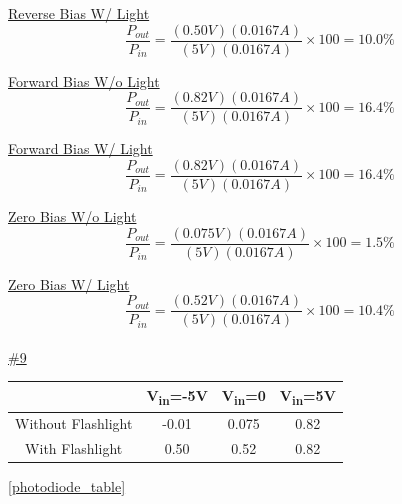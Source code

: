 \underline{Reverse Bias W/ Light}\\
\begin{equation}
\label{eq:Reverse Bias W/ Light}
\frac{P_{out}}{P_{in}} = \frac{(0.50V)(0.0167A)}{(5V)(0.0167A)} \times 100 = 10.0\%
\end{equation}

\underline{Forward Bias W/o Light}\\
\begin{equation}
\label{eq:Forward Bias W/o Light}
\frac{P_{out}}{P_{in}} = \frac{(0.82V)(0.0167A)}{(5V)(0.0167A)} \times 100 = 16.4\%
\end{equation}

\underline{Forward Bias W/ Light}\\
\begin{equation}
\label{eq:Forward Bias W/ Light}
\frac{P_{out}}{P_{in}} = \frac{(0.82V)(0.0167A)}{(5V)(0.0167A)} \times 100 = 16.4\%
\end{equation}

\underline{Zero Bias W/o Light}\\
\begin{equation}
\label{eq:Zero Bias W/o Light}
\frac{P_{out}}{P_{in}} = \frac{(0.075V)(0.0167A)}{(5V)(0.0167A)} \times 100 = 1.5\%
\end{equation}

\underline{Zero Bias W/ Light}\\
\begin{equation}
\label{eq:Zero Bias W/ Light}
\frac{P_{out}}{P_{in}} = \frac{(0.52V)(0.0167A)}{(5V)(0.0167A)} \times 100 = 10.4\%
\end{equation}
\\

\underline{\#9}

\centering
\begin{tabular}{| c | c | c | c |}\hline
	& V\textsubscript{in}=-5V & V\textsubscript{in}=0 & V\textsubscript{in}=5V \\\hline
	Without Flashlight & -0.01 & 0.075 & 0.82\\\hline
	With Flashlight & 0.50 & 0.52 & 0.82 \\\hline
\end{tabular}
\label{Voltage over Photodiode}
\ref{photodiode_table}
\\

